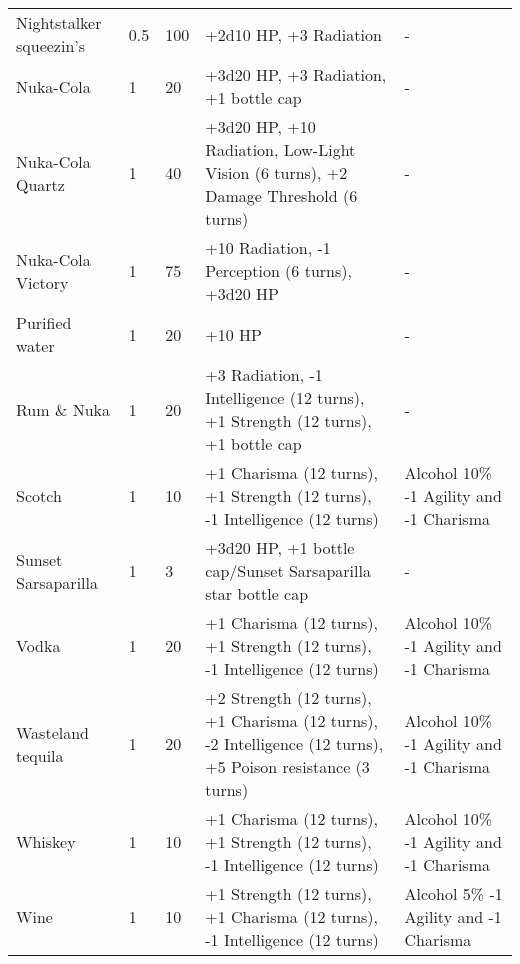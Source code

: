 \begin{longtable}{|p{4cm}|p{1.2cm}|p{1.2cm}|p{4cm}|p{4cm}|}
Nightstalker squeezin's  & 0.5  & 100 & +2d10 HP, +3 Radiation & -  \\
Nuka-Cola  & 1 & 20 & +3d20 HP, +3 Radiation, +1  bottle cap  & -  \\
Nuka-Cola Quartz  & 1 & 40 & +3d20 HP, +10 Radiation, Low-Light Vision (6 turns), +2 Damage Threshold (6 turns)  & -  \\
Nuka-Cola Victory  & 1 & 75 & +10 Radiation, -1 Perception (6 turns), +3d20 HP  & -  \\
Purified water  & 1 & 20 & +10 HP & -  \\
Rum  \&  Nuka  & 1 & 20 & +3 Radiation, -1 Intelligence (12 turns), +1 Strength (12 turns), +1 bottle cap  & -  \\
Scotch  & 1 & 10 & +1 Charisma (12 turns), +1 Strength (12 turns), -1 Intelligence (12 turns)  & Alcohol  10\% -1 Agility and -1 Charisma  \\
Sunset Sarsaparilla  & 1 & 3 & +3d20 HP, +1 bottle cap/Sunset Sarsaparilla star bottle cap  & -  \\
Vodka  & 1 & 20 & +1 Charisma (12 turns), +1 Strength (12 turns), -1 Intelligence (12 turns)  & Alcohol  10\% -1 Agility and -1 Charisma  \\
Wasteland tequila  & 1 & 20 & +2 Strength (12 turns), +1 Charisma (12 turns), -2 Intelligence (12 turns), +5 Poison resistance (3 turns)  & Alcohol  10\% -1 Agility and -1 Charisma  \\
Whiskey  & 1 & 10 & +1 Charisma (12 turns), +1 Strength (12 turns), -1 Intelligence (12 turns) & Alcohol  10\% -1 Agility and -1 Charisma  \\
Wine  & 1 & 10 & +1 Strength (12 turns), +1 Charisma (12 turns), -1 Intelligence (12 turns)  & Alcohol  5\% -1 Agility and -1 Charisma  \\
\hline
\end{longtable}
